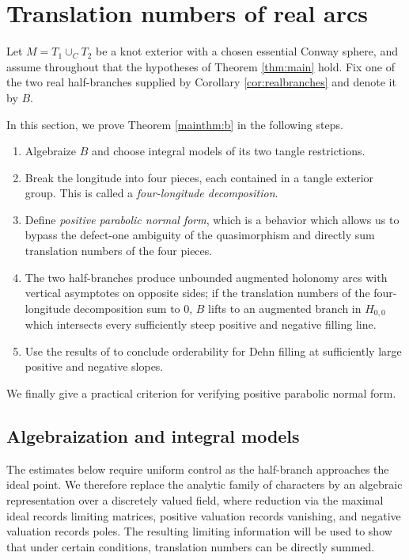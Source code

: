 \documentclass{article}
\theoremstyle{plain}
\theoremstyle{definition}
\theoremstyle{plain}
\theoremstyle{plain}
\theoremstyle{plain}
\theoremstyle{remark}
\theoremstyle{remark}
\theoremstyle{plain}
\theoremstyle{plain}
\newcounter{main}
\theoremstyle{plain}
\theoremstyle{plain}
\begin{document}
\section{Translation numbers of real arcs}\label{sec:trans}

Let $M=T_1\cup_C T_2$ be a knot exterior with a chosen essential Conway sphere, and assume throughout that the hypotheses of Theorem \ref{thm:main} hold. Fix one of the two real half-branches supplied by Corollary \ref{cor:realbranches} and denote it by $B$.

\medskip

In this section, we prove Theorem \ref{mainthm:b} in the following steps.
\begin{enumerate}
	\item Algebraize $B$ and choose integral models of its two tangle restrictions.
	\item Break the longitude into four pieces, each contained in a tangle exterior group. This is called a \emph{four-longitude decomposition}. 
	\item Define \emph{positive parabolic normal form}, which is a behavior which allows us to bypass the defect-one ambiguity of the quasimorphism and directly sum translation numbers of the four pieces.
	\item The two half-branches produce unbounded augmented holonomy arcs with vertical asymptotes on opposite sides; if the translation numbers of the four-longitude decomposition sum to 0, $B$ lifts to an augmented branch in $H_{0,0}$ which intersects every sufficiently steep positive and negative filling line.
	\item Use the results of \cite{gao} to conclude orderability for Dehn filling at sufficiently large positive and negative slopes.   
\end{enumerate}
We finally give a practical criterion for verifying positive parabolic normal form. 

\subsection{Algebraization and integral models}

The estimates below require uniform control as the half-branch approaches the ideal point. We therefore replace the analytic family of characters by an algebraic representation over a discretely valued field, where reduction via the maximal ideal records limiting matrices, positive valuation records vanishing, and negative valuation records poles. The resulting limiting information will be used to show that under certain conditions, translation numbers can be directly summed. 
\end{document}
